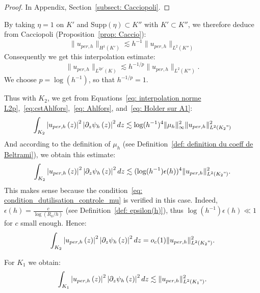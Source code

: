 \documentclass[leqno,11pt,letterpaper, english]{amsart}
\theoremstyle{plain}
\theoremstyle{definition}
\numberwithin{equation}{section}
\begin{document}
\begin{proof}
In Appendix, Section~\ref{subsect: Cacciopoli}.
\end{proof}

By taking $\eta = 1$ on $K'$ and $\text{Supp}(\eta) \subset K''$ with $K' \subset K''$, we therefore deduce from Cacciopoli (Proposition~\ref{prop: Caccio}):
	\begin{equation}
		\lVert u_{per,h}\lVert_{H^1(K')}\lesssim h^{-1}\lVert u_{per,h}\lVert_{L^2(K'')}
	\end{equation}
Consequently we get this interpolation estimate:
	\begin{equation}
		\label{eq: interpolation norme L2p}
		\lVert u_{per,h}\lVert_{L^{2p'}(K)}\lesssim h^{-1/p}\lVert u_{per,h}\lVert_{L^2{(K'')}}.
	\end{equation}
	We choose $p = \log(h^{-1})$, so that $h^{-1/p}=1$.
	
Thus with $K_2$, we get from Equations~\eqref{eq: interpolation norme L2p},~\eqref{eq:cstAhlfors},~\eqref{eq: Ahlfors}, and~\eqref{eq: Holder sur A1}:
	\begin{equation}
		 \int_{K_2} \left|u_{per,h}\left(z\right)\right|^2\left|\partial_z \psi_h\left(z\right)\right|^2dz \lesssim \log(h^{-1})^4 \lVert \mu_h\lVert_\infty^2 \|u_{per,h}\|_{L^2(K_2")}^2
	\end{equation}
And according to the definition of $\mu_h$ (see Definition~\ref{def: definition du coeff de Beltrami}), we obtain this estimate:
\begin{equation}
	\int_{K_2} \left|u_{per,h}\left(z\right)\right|^2\left|\partial_z \psi_h\left(z\right)\right|^2dz \lesssim (\log(h^{-1})\epsilon(h))^4 \|u_{per,h}\|_{L^2(K_2")}^2.
\end{equation}
This makes sense because the condition~\eqref{eq: condition_dutilisation_controle_mu} is verified in this case. Indeed, $\epsilon(h) = \frac{c}{\log(R_0/h)}$ (see Definition~\ref{def: epsilon(h)}), thus $\log(h^{-1})\epsilon(h) \ll 1$ for $c$ small enough. Hence:
\begin{equation}
	\int_{K_2} \left|u_{per,h}\left(z\right)\right|^2\left|\partial_z \psi_h\left(z\right)\right|^2dz=o_c(1) \|u_{per,h}\|_{L^2(K_2")}^2.
\end{equation}

For $K_1$  we obtain:
\begin{equation}
	\int_{K_1} \left|u_{per,h}\left(z\right)\right|^2\left|\partial_z \psi_h\left(z\right)\right|^2dz \lesssim  \|u_{per,h}\|_{L^2(K_1")}^2.
\end{equation}
\end{document}
